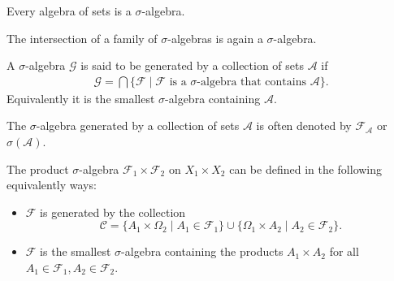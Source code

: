     \begin{result}
        Every algebra of sets is a $\sigma$-algebra.
    \end{result}

    \begin{property}[Intersections]
        The intersection of a family of $\sigma$-algebras is again a $\sigma$-algebra.
    \end{property}

    \begin{definition}
        A $\sigma$-algebra $\mathcal{G}$ is said to be generated by a collection of sets $\mathcal{A}$ if
        \begin{gather}
            \label{set:generated_sigma_algebra}
            \mathcal{G} = \bigcap\{\mathcal{F}\mid\mathcal{F}\text{ is a } \sigma\text{-algebra that contains }\mathcal{A}\}.
        \end{gather}
        Equivalently it is the smallest $\sigma$-algebra containing $\mathcal{A}$.
    \end{definition}
    \begin{notation}\label{set:notation:generated_sigma_algebra}
        The $\sigma$-algebra generated by a collection of sets $\mathcal{A}$ is often denoted by $\mathcal{F}_\mathcal{A}$ or $\sigma(\mathcal{A})$.
    \end{notation}

    \begin{definition}\label{set:product_of_sigma_algebras}
        The product $\sigma$-algebra $\mathcal{F}_1\times\mathcal{F}_2$ on $X_1\times X_2$ can be defined in the following equivalently ways:
        \begin{itemize}
            \item $\mathcal{F}$ is generated by the collection
                \[\mathcal{C} = \{A_1\times\Omega_2\mid A_1\in\mathcal{F}_1\}\cup\{\Omega_1\times A_2\mid A_2\in\mathcal{F}_2\}.\]
            \item $\mathcal{F}$ is the smallest $\sigma$-algebra containing the products $A_1\times A_2$ for all $A_1\in\mathcal{F}_1, A_2\in\mathcal{F}_2$.
        \end{itemize}
    \end{definition}


